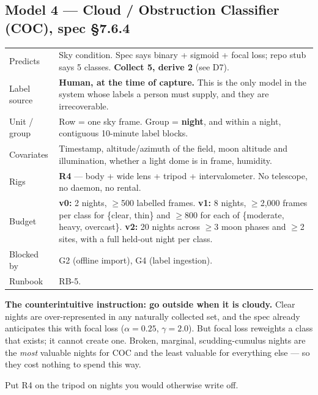\documentclass[11pt]{article}
\begin{document}
\subsection{Model 4 --- Cloud / Obstruction Classifier (COC), spec \S7.6.4}\label{m:coc}

\begin{center}
\small
\begin{tabular}{@{}p{}p{}@{}}
\toprule
Predicts & Sky condition. Spec says binary + sigmoid + focal loss; repo stub says 5 classes. \textbf{Collect 5, derive 2} (see D7). \\
Label source & \textbf{Human, at the time of capture.} This is the only model in the system whose labels a person must supply, and they are irrecoverable. \\
Unit / group & Row = one sky frame. Group = \textbf{night}, and within a night, contiguous 10-minute label blocks. \\
Covariates & Timestamp, altitude/azimuth of the field, moon altitude and illumination, whether a light dome is in frame, humidity. \\
Rigs & \textbf{R4} --- body + wide lens + tripod + intervalometer. No telescope, no daemon, no rental. \\
Budget & \textbf{v0:} 2 nights, $\geq$500 labelled frames. \textbf{v1:} 8 nights, $\geq$2,000 frames per class for \{clear, thin\} and $\geq$800 for each of \{moderate, heavy, overcast\}. \textbf{v2:} 20 nights across $\geq$3 moon phases and $\geq$2 sites, with a full held-out night per class. \\
Blocked by & G2 (offline import), G4 (label ingestion). \\
Runbook & RB-5. \\
\bottomrule
\end{tabular}
\end{center}

\begin{keybox}
\textbf{The counterintuitive instruction: go outside when it is cloudy.} Clear
nights are over-represented in any naturally collected set, and the spec already
anticipates this with focal loss ($\alpha = 0.25$, $\gamma = 2.0$). But focal
loss reweights a class that exists; it cannot create one. Broken, marginal,
scudding-cumulus nights are the \emph{most} valuable nights for COC and the
least valuable for everything else --- so they cost nothing to spend this way.

Put R4 on the tripod on nights you would otherwise write off.
\end{keybox}
\end{document}

